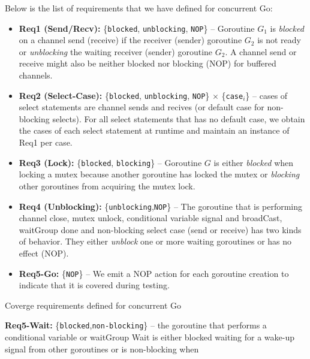 Below is the list of requirements that we have defined for concurrent Go:
\begin{itemize}
  \item \textbf{Req1 (Send/Recv):} \{\texttt{blocked}, \texttt{unblocking}, \texttt{NOP}\} -- Goroutine $G_1$ is \textit{blocked} on a channel send (receive) if the receiver (sender) goroutine $G_2$ is not ready or \textit{unblocking} the waiting receiver (sender) goroutine $G_2$. A channel send or receive might also be neither blocked nor blocking (NOP) for buffered channels.
  \item \textbf{Req2 (Select-Case):} \{\texttt{blocked}, \texttt{unblocking}, \texttt{NOP}\} $\times$ \{\texttt{case}$_i$\} -- cases of select statements are channel sends and recives (or default case for non-blocking selects). For all select statements that has no default case, we obtain the cases of each select statement at runtime and maintain an instance of Req1 per case.
  \item \textbf{Req3 (Lock):} \{\texttt{blocked}, \texttt{blocking}\} -- Goroutine $G$ is either \textit{blocked} when locking a mutex because another goroutine has locked the mutex or \textit{blocking} other goroutines from acquiring the mutex lock.
  \item \textbf{Req4 (Unblocking):} \{\texttt{unblocking},\texttt{NOP}\} -- The goroutine that is performing channel close, mutex unlock, conditional variable signal and broadCast, waitGroup done and non-blocking select case (send or receive) has two kinds of behavior. They either \textit{unblock} one or more waiting goroutines or has no effect (NOP).
  \item \textbf{Req5-Go:} \{\texttt{NOP}\} -- We emit a NOP action for each goroutine creation to indicate that it is covered during testing.
\end{itemize}




\begin{table}[]
\centering
\caption{Coverge requirements defined for concurrent Go}
\scalebox{0.9}{

}
\label{tab:cov_req}
\end{table}



\textbf{Req5-Wait:} \{\texttt{blocked},\texttt{non-blocking}\} -- the goroutine that performs a conditional variable or waitGroup Wait is either blocked waiting for a wake-up signal from other goroutines or is non-blocking when

